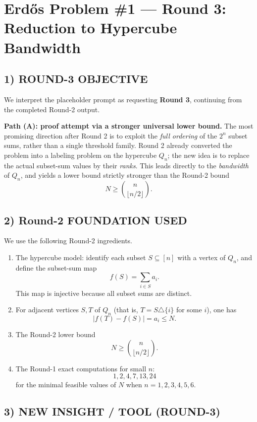 \section{Erd\H{o}s Problem \#1 --- Round 3: Reduction to Hypercube Bandwidth}

\subsection{1) ROUND-3 OBJECTIVE}

We interpret the placeholder prompt as requesting \textbf{Round 3}, continuing from the completed Round-2 output.

\textbf{Path (A): proof attempt via a stronger universal lower bound.}
The most promising direction after Round 2 is to exploit the \emph{full ordering} of the $2^n$ subset sums, rather than a single threshold family. Round 2 already converted the problem into a labeling problem on the hypercube $Q_n$; the new idea is to replace the actual subset-sum values by their \emph{ranks}. This leads directly to the \emph{bandwidth} of $Q_n$, and yields a lower bound strictly stronger than the Round-2 bound
\[
N\ge \binom{n}{\lfloor n/2\rfloor}.
\]

\subsection{2) Round-2 FOUNDATION USED}

We use the following Round-2 ingredients.
\begin{enumerate}
\item The hypercube model: identify each subset $S\subseteq [n]$ with a vertex of $Q_n$, and define the subset-sum map
\[
f(S)=\sum_{i\in S} a_i.
\]
This map is injective because all subset sums are distinct.
\item For adjacent vertices $S,T$ of $Q_n$ (that is, $T=S\triangle\{i\}$ for some $i$), one has
\[
|f(T)-f(S)|=a_i\le N.
\]
\item The Round-2 lower bound
\[
N\ge \binom{n}{\lfloor n/2\rfloor}.
\]
\item The Round-1 exact computations for small $n$:
\[
1,2,4,7,13,24
\]
for the minimal feasible values of $N$ when $n=1,2,3,4,5,6$.
\end{enumerate}

\subsection{3) NEW INSIGHT / TOOL (ROUND-3)}

